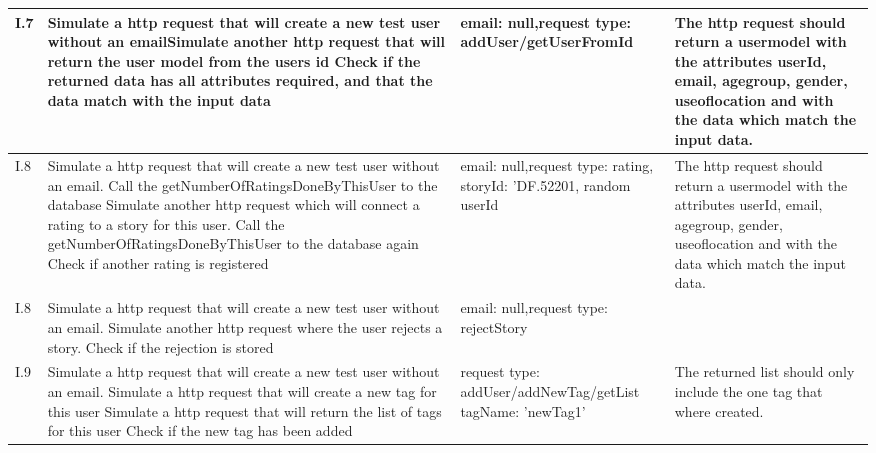 {{\begin{longtable}{ | p{1cm} | p{6.5cm} | p{3cm} | p{6.5cm} |}
			I.7 & Simulate a http request that will create a new test user without an email\newline  Simulate another http request that will return the user model from the users id \newline Check if the returned data has all attributes required, and that the data match with the input data & email: null,\newline request type: addUser/getUserFromId  & The http request should return a usermodel with the attributes userId, email, age\textunderscore group, gender, use\textunderscore of\textunderscore location and with the data which match the input data.  \\ \hline
			
			I.8 & Simulate a http request that will create a new test user without an email. \newline Call the getNumberOfRatingsDoneByThisUser to the database \newline  Simulate another http request which will connect a rating to a story for this user.  \newline Call the getNumberOfRatingsDoneByThisUser to the database again \newline Check if another rating is registered & email: null,\newline request type: rating, storyId: 'DF.52201, random userId  & The http request should return a usermodel with the attributes userId, email, age\textunderscore group, gender, use\textunderscore of\textunderscore location and with the data which match the input data.  \\ \hline
			
			I.8 & Simulate a http request that will create a new test user without an email. \newline  \newline  Simulate another http request where the user rejects a story.  \newline  \newline Check if the rejection is stored & email: null,\newline request type: rejectStory  &   \\ \hline

			I.9 & Simulate a http request that will create a new test user without an email. \newline  Simulate a http request that will create a new tag for this user \newline Simulate a http request that will return the list of tags for this user \newline Check if the new tag has been added  & request type: addUser/addNewTag/getList  tagName: 'newTag1' & The returned list should only include the one tag that where created. \\ \hline
			

\end{longtable}}}
